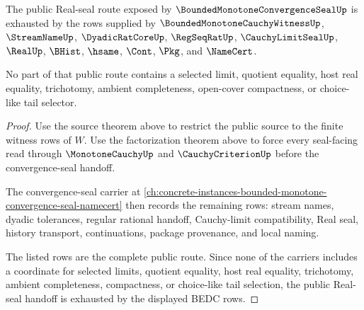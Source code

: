 \begin{theorem}
\label{thm:bounded-monotone-cauchy-witness-real-seal-public-unblock}
The public Real-seal route exposed by $\BoundedMonotoneConvergenceSealUp$ is exhausted by the rows supplied by $\BoundedMonotoneCauchyWitnessUp$, $\StreamNameUp$, $\DyadicRatCoreUp$, $\RegSeqRatUp$, $\CauchyLimitSealUp$, $\RealUp$, $\BHist$, $\hsame$, $\Cont$, $\Pkg$, and $\NameCert$.

No part of that public route contains a selected limit, quotient equality, host real equality, trichotomy, ambient completeness, open-cover compactness, or choice-like tail selector.
\end{theorem}
\begin{proof}
Use the source theorem above to restrict the public source to the finite witness rows of $W$. Use the factorization theorem above to force every seal-facing read through $\MonotoneCauchyUp$ and $\CauchyCriterionUp$ before the convergence-seal handoff.

The convergence-seal carrier at \autoref{ch:concrete-instances-bounded-monotone-convergence-seal-namecert} then records the remaining rows: stream names, dyadic tolerances, regular rational handoff, Cauchy-limit compatibility, Real seal, history transport, continuations, package provenance, and local naming.

The listed rows are the complete public route. Since none of the carriers includes a coordinate for selected limits, quotient equality, host real equality, trichotomy, ambient completeness, compactness, or choice-like tail selection, the public Real-seal handoff is exhausted by the displayed BEDC rows.
\end{proof}

